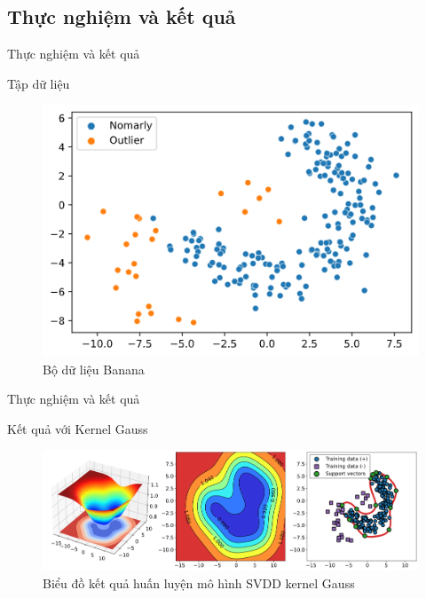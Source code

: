 \documentclass[
	10pt,                %
	aspectratio=169,     %
]{beamer}
\begin{document}
\subsection{Thực nghiệm và kết quả}
         \begin{frame}{Thực nghiệm và kết quả}
                \begin{block}{Tập dữ liệu}
            		\begin{figure}
                		\centering
                 	\includegraphics[scale=0.35]{figures/banana.png}
                		\caption{Bộ dữ liệu Banana}
                	\end{figure}
                \end{block}
            \end{frame}	
            
            \begin{frame}{Thực nghiệm và kết quả}
                \begin{block}{Kết quả với Kernel Gauss}
            		\begin{figure}
                		\centering
            	\includegraphics[scale=0.22]{figures/gauss_result.png}
                		\caption{ Biểu đồ kết quả huấn luyện mô hình SVDD kernel Gauss}
                	\end{figure}
                \end{block}
            \end{frame}	
            
\end{document}
